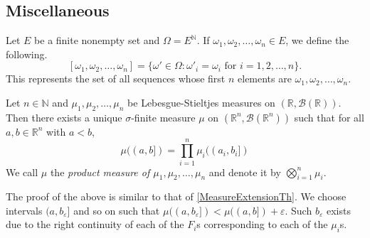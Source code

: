 \subsection{Miscellaneous}

Let $E$ be a finite nonempty set and $\Omega = E^\mathbb{N}$. If $\omega_1,\omega_2,\ldots,\omega_n\in E$, we define the following.
$$[\omega_1,\omega_2,\ldots,\omega_n]=\{\omega'\in\Omega : \omega'_i=\omega_i\text{ for }i=1,2,\ldots,n\}.$$
This represents the set of all sequences whose first $n$ elements are $\omega_1,\omega_2,\ldots,\omega_n$.

\begin{theorem}
        Let $n\in\mathbb{N}$ and $\mu_1,\mu_2,\ldots,\mu_n$ be Lebesgue-Stieltjes measures on $(\mathbb{R},\mathcal{B}(\mathbb{R}))$. Then there exists a unique $\sigma$-finite measure $\mu$ on $(\mathbb{R}^n, \mathcal{B}(\mathbb{R}^n))$ such that for all $a,b\in\mathbb{R}^n$ with $a<b$,
        $$\mu((a,b])=\prod_{i=1}^n \mu_i((a_i,b_i])$$
        We call $\mu$ the \textit{product measure of $\mu_1,\mu_2,\ldots,\mu_n$} and denote it by $\bigotimes_{i=1}^n\mu_i$.
\end{theorem}

The proof of the above is similar to that of \ref{MeasureExtensionTh}. We choose intervals $(a,b_\varepsilon]$ and so on such that $\mu((a,b_\varepsilon])<\mu((a,b])+\varepsilon$. Such $b_\varepsilon$ exists due to the right continuity of each of the $F_i$s corresponding to each of the $\mu_i$s.



\clearpage